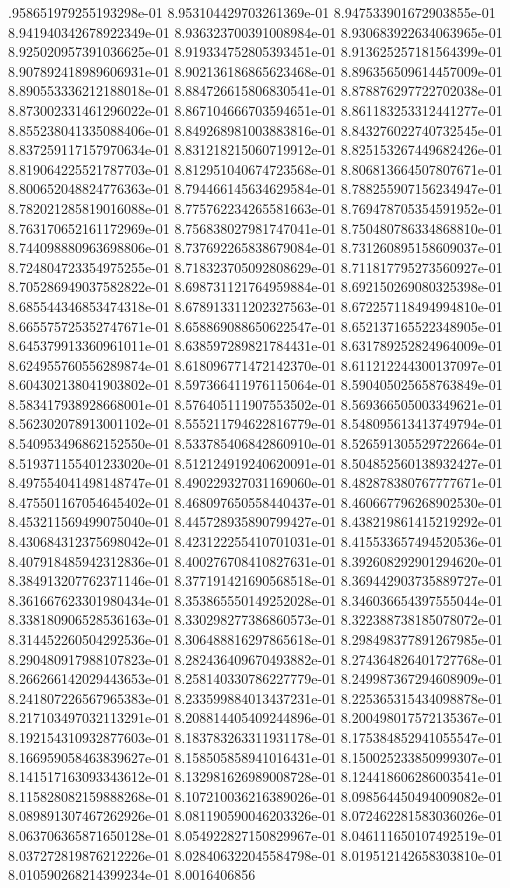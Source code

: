 .958651979255193298e-01	8.953104429703261369e-01	8.947533901672903855e-01	8.941940342678922349e-01	8.936323700391008984e-01	8.930683922634063965e-01	8.925020957391036625e-01	8.919334752805393451e-01	8.913625257181564399e-01	8.907892418989606931e-01	8.902136186865623468e-01	8.896356509614457009e-01	8.890553336212188018e-01	8.884726615806830541e-01	8.878876297722702038e-01	8.873002331461296022e-01	8.867104666703594651e-01	8.861183253312441277e-01	8.855238041335088406e-01	8.849268981003883816e-01	8.843276022740732545e-01	8.837259117157970634e-01	8.831218215060719912e-01	8.825153267449682426e-01	8.819064225521787703e-01	8.812951040674723568e-01	8.806813664507807671e-01	8.800652048824776363e-01	8.794466145634629584e-01	8.788255907156234947e-01	8.782021285819016088e-01	8.775762234265581663e-01	8.769478705354591952e-01	8.763170652161172969e-01	8.756838027981747041e-01	8.750480786334868810e-01	8.744098880963698806e-01	8.737692265838679084e-01	8.731260895158609037e-01	8.724804723354975255e-01	8.718323705092808629e-01	8.711817795273560927e-01	8.705286949037582822e-01	8.698731121764959884e-01	8.692150269080325398e-01	8.685544346853474318e-01	8.678913311202327563e-01	8.672257118494994810e-01	8.665575725352747671e-01	8.658869088650622547e-01	8.652137165522348905e-01	8.645379913360961011e-01	8.638597289821784431e-01	8.631789252824964009e-01	8.624955760556289874e-01	8.618096771472142370e-01	8.611212244300137097e-01	8.604302138041903802e-01	8.597366411976115064e-01	8.590405025658763849e-01	8.583417938928668001e-01	8.576405111907553502e-01	8.569366505003349621e-01	8.562302078913001102e-01	8.555211794622816779e-01	8.548095613413749794e-01	8.540953496862152550e-01	8.533785406842860910e-01	8.526591305529722664e-01	8.519371155401233020e-01	8.512124919240620091e-01	8.504852560138932427e-01	8.497554041498148747e-01	8.490229327031169060e-01	8.482878380767777671e-01	8.475501167054645402e-01	8.468097650558440437e-01	8.460667796268902530e-01	8.453211569499075040e-01	8.445728935890799427e-01	8.438219861415219292e-01	8.430684312375698042e-01	8.423122255410701031e-01	8.415533657494520536e-01	8.407918485942312836e-01	8.400276708410827631e-01	8.392608292901294620e-01	8.384913207762371146e-01	8.377191421690568518e-01	8.369442903735889727e-01	8.361667623301980434e-01	8.353865550149252028e-01	8.346036654397555044e-01	8.338180906528536163e-01	8.330298277386860573e-01	8.322388738185078072e-01	8.314452260504292536e-01	8.306488816297865618e-01	8.298498377891267985e-01	8.290480917988107823e-01	8.282436409670493882e-01	8.274364826401727768e-01	8.266266142029443653e-01	8.258140330786227779e-01	8.249987367294608909e-01	8.241807226567965383e-01	8.233599884013437231e-01	8.225365315434098878e-01	8.217103497032113291e-01	8.208814405409244896e-01	8.200498017572135367e-01	8.192154310932877603e-01	8.183783263311931178e-01	8.175384852941055547e-01	8.166959058463839627e-01	8.158505858941016431e-01	8.150025233850999307e-01	8.141517163093343612e-01	8.132981626989008728e-01	8.124418606286003541e-01	8.115828082159888268e-01	8.107210036216389026e-01	8.098564450494009082e-01	8.089891307467262926e-01	8.081190590046203326e-01	8.072462281583036026e-01	8.063706365871650128e-01	8.054922827150829967e-01	8.046111650107492519e-01	8.037272819876212226e-01	8.028406322045584798e-01	8.019512142658303810e-01	8.010590268214399234e-01	8.0016406856